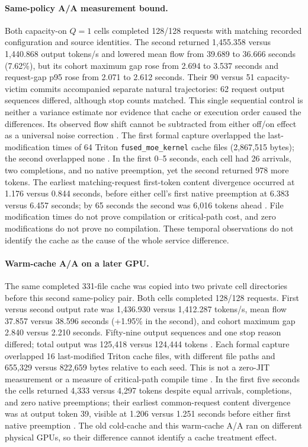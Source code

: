 \documentclass[10pt]{article}
\begin{document}
\paragraph{Same-policy A/A measurement bound.}
Both capacity-on $Q=1$ cells completed 128/128 requests with matching recorded configuration and source identities. The second returned 1,455.358 versus 1,440.868 output tokens/s and lowered mean flow from 39.689 to 36.666 seconds (7.62\%), but its cohort maximum gap rose from 2.694 to 3.537 seconds and request-gap p95 rose from 2.071 to 2.612 seconds. Their 90 versus 51 capacity-victim commits accompanied separate natural trajectories: 62 request output sequences differed, although stop counts matched. This single sequential control is neither a variance estimate nor evidence that cache or execution order caused the differences. Its observed flow shift cannot be subtracted from either off/on effect as a universal noise correction \cite{capacityaa}.
The first formal capture overlapped the last-modification times of 64 Triton \texttt{fused\_moe\_kernel} cache files (2,867,515 bytes); the second overlapped none \cite{capacitycache}. In the first 0--5 seconds, each cell had 26 arrivals, two completions, and no native preemption, yet the second returned 978 more tokens. The earliest matching-request first-token content divergence occurred at 1.176 versus 0.844 seconds, before either cell's first native preemption at 6.383 versus 6.457 seconds; by 65 seconds the second was 6,016 tokens ahead \cite{capacityphases}. File modification times do not prove compilation or critical-path cost, and zero modifications do not prove no compilation. These temporal observations do not identify the cache as the cause of the whole service difference.

\paragraph{Warm-cache A/A on a later GPU.}
The same completed 331-file cache was copied into two private cell directories before this second same-policy pair. Both cells completed 128/128 requests. First versus second output rate was 1,436.930 versus 1,412.287 tokens/s, mean flow 37.857 versus 38.596 seconds (+1.95\% in the second), and cohort maximum gap 2.840 versus 2.210 seconds. Fifty-nine output sequences and one stop reason differed; total output was 125,418 versus 124,444 tokens \cite{warmcapacityaa}. Each formal capture overlapped 16 last-modified Triton cache files, with different file paths and 655,329 versus 822,659 bytes relative to each seed. This is not a zero-JIT measurement or a measure of critical-path compile time \cite{warmcapacitycache}. In the first five seconds the cells returned 4,333 versus 4,297 tokens despite equal arrivals, completions, and zero native preemptions; their earliest common-request content divergence was at output token 39, visible at 1.206 versus 1.251 seconds before either first native preemption \cite{warmcapacityphases}. The old cold-cache and this warm-cache A/A ran on different physical GPUs, so their difference cannot identify a cache treatment effect.
\end{document}
